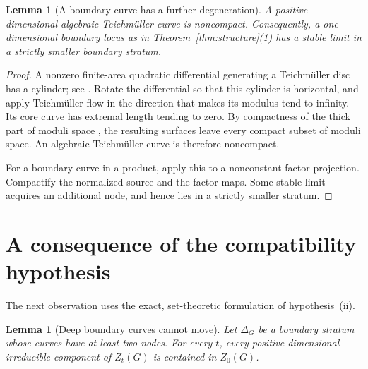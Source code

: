 \documentclass[11pt]{article}
\newtheorem{lemma}[theorem]{Lemma}
\theoremstyle{remark}
\begin{document}
\begin{lemma}[A boundary curve has a further degeneration]
\label{lem:cusp}
A positive-dimensional algebraic Teichm\"uller curve is
noncompact. Consequently, a one-dimensional boundary locus as
in Theorem~\ref{thm:structure}(1) has a stable limit in a strictly
smaller boundary stratum.
\end{lemma}

\begin{proof}
A nonzero finite-area quadratic differential generating a
Teichm\"uller disc has a cylinder; see \cite{Masur}.
Rotate the differential so that this cylinder is horizontal,
and apply Teichm\"uller flow in the direction that makes its
modulus tend to infinity. Its core curve has extremal length
tending to zero. By compactness of the thick part of moduli
space \cite{Mumford}, the resulting surfaces leave every compact
subset of moduli space. An algebraic Teichm\"uller curve is
therefore noncompact.

For a boundary curve in a product, apply this to a nonconstant
factor projection. Compactify the normalized source and the
factor maps. Some stable limit acquires an additional node,
and hence lies in a strictly smaller stratum.

\end{proof}

\section{A consequence of the compatibility hypothesis}

The next observation uses the exact, set-theoretic formulation
of hypothesis~(ii).

\begin{lemma}[Deep boundary curves cannot move]\label{lem:deep}
Let \(\Delta_G\) be a boundary stratum whose curves have at least
two nodes. For every \(t\), every positive-dimensional
irreducible component of \(Z_t(G)\) is contained in \(Z_0(G)\).
\end{lemma}
\end{document}
